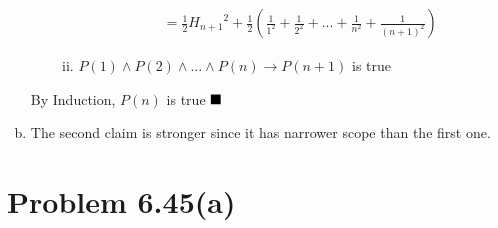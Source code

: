 \documentclass{article}
\def\math#1{$#1$}
\begin{document}
\begin{enumerate}[(a)]
\begin{itemize}
\begin{enumerate}[i)]
\begin{equation}
\begin{split}
                                            & = \frac{1}{2}{H_{n+1}}^2 + \frac{1}{2}(\frac{1}{1^2}+\frac{1}{2^2}+...+\frac{1}{n^2} + \frac{1}{{(n+1)}^2})
                                    \end{split}
                            \end{equation}
                        \item \math{P(1)\land P(2)\land ... \land P(n) \to P(n+1)} is true
                    \end{enumerate} 
            \end{itemize}
            By Induction, \math{P(n)} is true \math{\hfill{\blacksquare}}
            \item The second claim is stronger since it has narrower scope than the first one.
\end{enumerate}

\section{Problem 6.45(a)}
\end{document}
